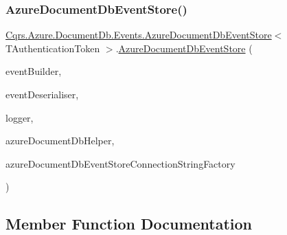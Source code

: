 \subsubsection{\texorpdfstring{Azure\+Document\+Db\+Event\+Store()}{AzureDocumentDbEventStore()}}
{\footnotesize\ttfamily \hyperlink{classCqrs_1_1Azure_1_1DocumentDb_1_1Events_1_1AzureDocumentDbEventStore}{Cqrs.\+Azure.\+Document\+Db.\+Events.\+Azure\+Document\+Db\+Event\+Store}$<$ T\+Authentication\+Token $>$.\hyperlink{classCqrs_1_1Azure_1_1DocumentDb_1_1Events_1_1AzureDocumentDbEventStore}{Azure\+Document\+Db\+Event\+Store} (\begin{DoxyParamCaption}\item[{\hyperlink{interfaceCqrs_1_1Events_1_1IEventBuilder}{I\+Event\+Builder}$<$ T\+Authentication\+Token $>$}]{event\+Builder,  }\item[{\hyperlink{interfaceCqrs_1_1Events_1_1IEventDeserialiser}{I\+Event\+Deserialiser}$<$ T\+Authentication\+Token $>$}]{event\+Deserialiser,  }\item[{I\+Logger}]{logger,  }\item[{\hyperlink{interfaceCqrs_1_1Azure_1_1DocumentDb_1_1IAzureDocumentDbHelper}{I\+Azure\+Document\+Db\+Helper}}]{azure\+Document\+Db\+Helper,  }\item[{\hyperlink{interfaceCqrs_1_1Azure_1_1DocumentDb_1_1Events_1_1IAzureDocumentDbEventStoreConnectionStringFactory}{I\+Azure\+Document\+Db\+Event\+Store\+Connection\+String\+Factory}}]{azure\+Document\+Db\+Event\+Store\+Connection\+String\+Factory }\end{DoxyParamCaption})}



\subsection{Member Function Documentation}
\mbox{\label{classCqrs_1_1Azure_1_1DocumentDb_1_1Events_1_1AzureDocumentDbEventStore_a54f298fdde141166e23f01e4911bf188_a54f298fdde141166e23f01e4911bf188}} 
